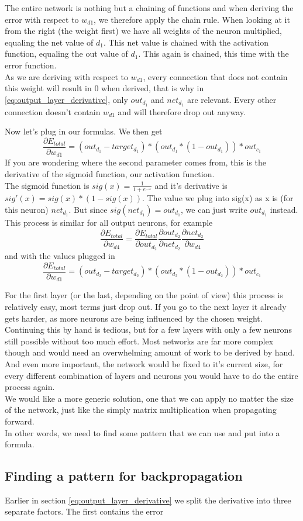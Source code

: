 \documentclass[11pt, halfparskip]{article}
\begin{document}
    The entire network is nothing but a chaining of functions and when deriving the error with respect to $w_{d1}$, we therefore apply the chain rule. When looking at it from the right 
    (the weight first) we have all weights of the neuron multiplied, equaling the net value of $d_1$. This net value is chained with the activation function, equaling the out value of $d_1$.
    This again is chained, this time with the error function.\\
    As we are deriving with respect to $w_{d1}$, every connection that does not contain this weight will result in 0 when derived, that is why in \ref{eq:output_layer_derivative}, only
    $out_{d_1}$ and $net_{d_1}$ are relevant. Every other connection doesn't contain $w_{d1}$ and will therefore drop out anyway.
    
    \noindent \newline
    Now let's plug in our formulas. We then get
    \[
    	\frac{\partial E_{total}}{\partial w_{d1}} = (out_{d_1} - target_{d_1}) * (out_{d_1} * (1 - out_{d_1})) * out_{c_1}
    \]
    If you are wondering where the second parameter comes from, this is the derivative of the sigmoid function, our activation function.\\
    The sigmoid function is $sig(x) = \frac{1}{1 + e^{-x}}$ and it's derivative is \\$sig'(x) = sig(x) * (1 - sig(x))$. The value we plug into sig(x) as x is (for this neuron) $net_{d_1}$.
    But since $sig(net_{d_1}) = out_{d_1}$, we can just write $out_{d_1}$ instead.\\
    This process is similar for all output neurons, for example 
    \[
    	\frac{\partial E_{total}}{\partial w_{d4}} = \frac{\partial E_{total}}{\partial out_{d_2}} \frac{\partial out_{d_2}}{\partial net_{d_2}} \frac{\partial net_{d_2}}{\partial w_{d4}}
    \]
    and with the values plugged in
    \[
    	\frac{\partial E_{total}}{\partial w_{d1}} = (out_{d_2} - target_{d_2}) * (out_{d_2} * (1 - out_{d_2})) * out_{c_1}
    \]
    
    \noindent \newline
    For the first layer (or the last, depending on the point of view) this process is relatively easy, most terms just drop out. If you go to the next layer it already gets harder, as more
    neurons are being influenced by the chosen weight. Continuing this by hand is tedious, but for a few layers with only a few neurons still possible without too much effort. Most
    networks are far more complex though and would need an overwhelming amount of work to be derived by hand. And even more important, the network would be fixed to it's current
    size, for every different combination of layers and neurons you would have to do the entire process again.\\
    We would like a more generic solution, one that we can apply no matter the size of the network, just like the simply matrix multiplication when propagating forward.\\
    In other words, we need to find some pattern that we can use and put into a formula.
    
    \newpage
    \subsection{Finding a pattern for backpropagation}
    \label{sec:finding_a_pattern_for_backpropagation}
    Earlier in section \ref{eq:output_layer_derivative} we split the derivative into three separate factors. The first contains the error 
    
\end{document}
